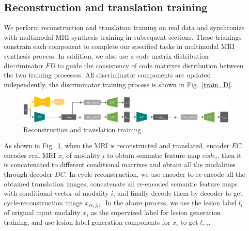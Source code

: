 \documentclass{ecai}
\begin{document}
\subsection{Reconstruction and translation training}
We perform reconstruction and translation training on real data and synchronize with multimodal MRI synthesis training in subsequent sections. These trianings constrain each component to complete our specified tasks in multimodal MRI synthesis process. In addition, we also use a code matrix distribution discriminator $FD$ to guide the consistency of code matrixes distribution between the two training processes. All discriminator components are updated independently, the discriminator training process is shown in Fig.~\ref{train_D}.

\begin{figure}
	\centering
	\includegraphics[width=1.75\columnwidth]{figures/trans_train}
	\caption{Reconstruction and translation training.}
	\label{trans_train}
\end{figure}

As shown in Fig.~\ref{trans_train}, when the MRI is reconstructed and translated, encoder $EC$ encodes real MRI $x_i$ of modality $i$ to obtain semantic feature map $code_{i}$, then it is concatenated to different conditional matrixes and obtain all the modalities through decoder $DC$. In cycle-reconstruction, we use encoder to re-encode all the obtained translation images, concatenate all re-encoded semantic feature maps with conditional vector of modality $i$, and finally decode them by decoder to get cycle-reconstruction image $x_{rc,j,i}$. In the above process, we use the lesion label $l_i$ of original input modality $x_i$ as the supervised label for lesion generation training, and use lesion label generation components for $x_i$ to get $l_{r,i}$.
\end{document}
